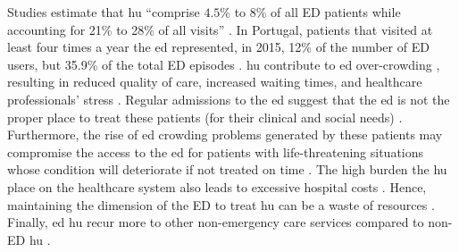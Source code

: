 \documentclass{bmcart}
\begin{document}
Studies estimate that \gls{hu} ``comprise $4.5\%$ to $8\%$ of all ED patients while accounting for 21\% to 28\% of all visits'' \cite{lacalle_frequent_2010}.
In Portugal, patients that visited at least four times a year the \gls{ed} represented, in 2015, 12\% of the number of ED users, but 35.9\% of the total ED episodes \cite{catarino_utilizadores_2017}.
\gls{hu} contribute to \gls{ed} over-crowding \cite{moe_effectiveness_2017, lee_characteristics_2020,seguin_frequent_2018, hunt_characteristics_2006}, resulting in reduced quality of care, increased waiting times, and healthcare professionals’ stress \cite{chiu_statistical_2019, van_den_heede_interventions_2016}. 
Regular admissions to the \gls{ed} suggest that the \gls{ed} is not the proper place to treat these patients (for their clinical and social needs) \cite{hudon_effectiveness_2016, van_den_heede_interventions_2016, ruger_analysis_2004, mandelberg_epidemiologic_2000}. 
Furthermore, the rise of \gls{ed} crowding problems generated by these patients may compromise the access to the \gls{ed} for patients with life-threatening situations whose condition will deteriorate if not treated on time  \cite{grimmer-somers_holistic_2010, navratil-strawn_emergency_2014, soril_reducing_2015, van_den_heede_interventions_2016, mandelberg_epidemiologic_2000, lee_utilization_2007}.
The high burden the \gls{hu} place on the healthcare system also leads to excessive hospital costs \cite{ruger_analysis_2004, frost_using_2017, okin_effects_2000}.
Hence, maintaining the dimension of the ED to treat \gls{hu} can be a waste of resources \cite{mandelberg_epidemiologic_2000}.  
Finally, \gls{ed} \gls{hu} recur more to other non-emergency care services compared to non-ED \gls{hu} \cite{hansagi_2001, sun_predictors_2003}. 
\end{document}
